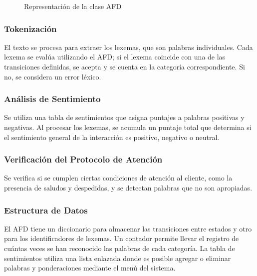 \documentclass[12pt,a4paper]{article}
\begin{document}
\begin{center}
\begin{figure}[h]
    \caption{Representación de la clase AFD}
    \label{fig:afd}
\end{figure}    
\end{center}
    

\subsubsection{Tokenización}
El texto se procesa para extraer los lexemas, que son palabras individuales.
Cada lexema se evalúa utilizando el AFD; si el lexema coincide con una de las transiciones definidas, se acepta y se cuenta en la categoría correspondiente. Si no, se considera un error léxico.

\subsubsection{Análisis de Sentimiento}
Se utiliza una tabla de sentimientos que asigna puntajes a palabras positivas y negativas.
Al procesar los lexemas, se acumula un puntaje total que determina si el sentimiento general de la interacción es positivo, negativo o neutral.

\subsubsection{Verificación del Protocolo de Atención}
Se verifica si se cumplen ciertas condiciones de atención al cliente, como la presencia de saludos y despedidas, y se detectan palabras que no son apropiadas.

\subsubsection{Estructura de Datos}
El AFD tiene un diccionario para almacenar las transiciones entre estados y otro para los identificadores de lexemas.
Un contador permite llevar el registro de cuántas veces se han reconocido las palabras de cada categoría. La tabla de sentimientos utiliza una lista enlazada donde es posible agregar o eliminar palabras y ponderaciones mediante el menú del sistema.
\end{document}
